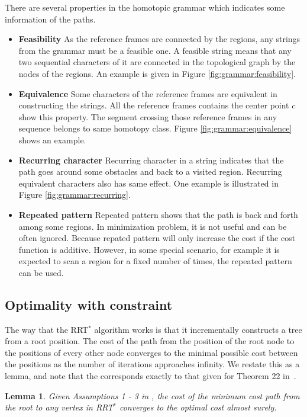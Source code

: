 \documentclass[letterpaper, 10 pt, conference]{ieeeconf}
\newtheorem{lem}{Lemma}
\begin{document}
There are several properties in the homotopic grammar which indicates some information of the paths.
\begin{itemize}
\item \textbf{Feasibility}
As the reference frames are connected by the regions, any strings from the grammar must be a feasible one.
A feasible string means that any two sequential characters of it are connected in the topological graph by the nodes of the regions.
An example is given in Figure \ref{fig:grammar:feasibility}.

\item \textbf{Equivalence}
Some characters of the reference frames are equivalent in constructing the strings.
All the reference frames contains the center point $ c $ show this property.
The segment crossing those reference frames in any sequence belongs to same homotopy class.
Figure \ref{fig:grammar:equivalence} shows an example.

\item \textbf{Recurring character}
Recurring character in a string indicates that the path goes around some obstacles and back to a visited region.
Recurring equivalent characters also has same effect.
One example is illustrated in Figure \ref{fig:grammar:recurring}.

\item \textbf{Repeated pattern}
Repeated pattern shows that the path is back and forth among some regions.
In minimization problem, it is not useful and can be often ignored.
Because repated pattern will only increase the cost if the cost function is additive.
However, in some special scenario, for example it is expected to scan a region for a fixed number of times, the repeated pattern can be used.

\end{itemize}

\subsection{Optimality with constraint}

The way that the RRT$^{*}$ algorithm works is that it incrementally constructs a tree from a root position.  
The cost of the path from the position of the root node to the positions of every other node converges to the minimal possible cost between the positions as the number of iterations approaches infinity.  
We restate this as a lemma, and note that the corresponds exactly to that given for Theorem 22 in~\cite{Karaman-RSS-10}.
\begin{lem}
\label{lem:tree_vex:conv}
Given Assumptions 1 - 3 in \cite{Karaman-RSS-10},
the cost of the minimum cost path from the root to any vertex in RRT$^{*}$ converges to the optimal cost almost surely.
\end{lem}
\end{document}

